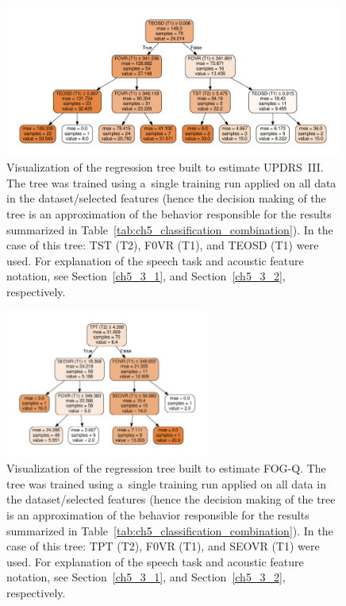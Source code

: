 \begin{figure}[htb!]
	\centering
	\scriptsize
	\includegraphics[width=0.99\textwidth]{pictures/ch5_tree_model_updrs.pdf}
	\caption[Regression tree graph visualization for UPDRS~III]{Visualization of the regression tree built to estimate UPDRS~III. The tree was trained using a~single training run applied on all data in the dataset/selected features (hence the decision making of the tree is an approximation of the behavior responsible for the results summarized in Table~\ref{tab:ch5_classification_combination}). In the case of this tree: TST (T2), F0VR (T1), and TEOSD (T1) were used. For explanation of the speech task and acoustic feature notation, see Section~\ref{ch5_3_1}, and Section~\ref{ch5_3_2}, respectively.}
	\label{fig:ch5_regression_tree_updrs}
\end{figure}

\begin{figure}[htb!]
	\centering
	\scriptsize
	\includegraphics[width=0.60\textwidth]{pictures/ch5_tree_model_fogq.pdf}
	\caption[Regression tree graph visualization for FOG-Q]{Visualization of the regression tree built to estimate FOG-Q. The tree was trained using a~single training run applied on all data in the dataset/selected features (hence the decision making of the tree is an approximation of the behavior responsible for the results summarized in Table~\ref{tab:ch5_classification_combination}). In the case of this tree: TPT (T2), F0VR (T1), and SEOVR (T1) were used. For explanation of the speech task and acoustic feature notation, see Section~\ref{ch5_3_1}, and Section~\ref{ch5_3_2}, respectively.}
	\label{fig:ch5_regression_tree_fogq}
\end{figure}

